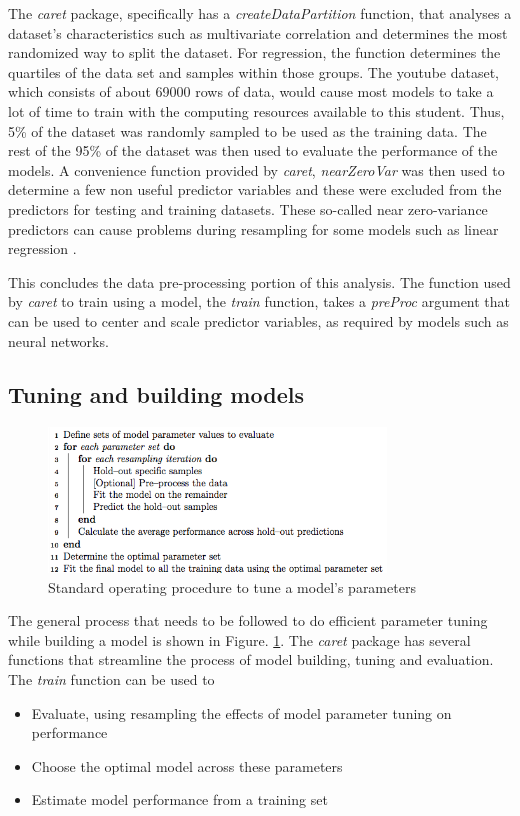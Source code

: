 \documentclass[letterpaper,12pt,titlepage,oneside,final]{report}
\begin{document}
            The \textit{caret} package, specifically has a \textit{createDataPartition} function, that analyses a dataset's characteristics such as multivariate correlation and determines the most randomized way to split the dataset. For regression, the function determines the quartiles of the data set and samples within those groups. The youtube dataset, which consists of about 69000 rows of data, would cause most models to take a lot of time to train with the computing resources available to this student. Thus, 5\% of the dataset was randomly sampled to be used as the training data. The rest of the 95\% of the dataset was then used to evaluate the performance of the models. A convenience function provided by \textit{caret}, \textit{nearZeroVar} was then used to determine a few non useful predictor variables and these were excluded from the predictors for testing and training datasets. These so-called near zero-variance predictors can cause problems during resampling for some models such as linear regression \cite{Kuhn2008}.

            This concludes the data pre-processing portion of this analysis. The function used by \textit{caret} to train using a model, the \textit{train} function, takes a \textit{preProc} argument that can be used to center and scale predictor variables, as required by models such as neural networks.
        \subsection{Tuning and building models}
            \begin{figure}[!h]
                \centering
                \includegraphics[width=0.8\textwidth]{training}
                \caption{Standard operating procedure to tune a model's parameters \cite{Model99:online}}
                \label{training}
            \end{figure}

            The general process that needs to be followed to do efficient parameter tuning while building a model is shown in Figure. \ref{training}. The \textit{caret} package has several functions that streamline the process of model building, tuning and evaluation. The \textit{train} function can be used to 
            \begin{itemize}
                \item {Evaluate, using resampling the effects of model parameter tuning on performance}
                \item {Choose the optimal model across these parameters}
                \item{Estimate model performance from a training set}\cite{Model99:online}
            \end{itemize}
            
\end{document}
